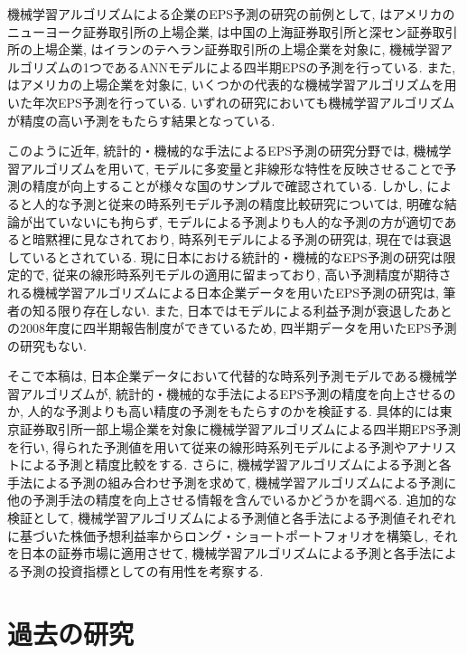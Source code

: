 \documentclass[a4paper, 12pt]{jsreport}
\begin{document}
機械学習アルゴリズムによる企業のEPS予測の研究の前例として, \cite{zhang2004neural}はアメリカのニューヨーク証券取引所の上場企業, \cite*{cao2009forecasting} は中国の上海証券取引所と深セン証券取引所の上場企業, \cite{etemadi2015earnings}はイランのテヘラン証券取引所の上場企業を対象に, 機械学習アルゴリズムの1つであるANNモデルによる四半期EPSの予測を行っている. また, \cite*{cao2020fundamental}はアメリカの上場企業を対象に, いくつかの代表的な機械学習アルゴリズムを用いた年次EPS予測を行っている. いずれの研究においても機械学習アルゴリズムが精度の高い予測をもたらす結果となっている. 

このように近年, 統計的・機械的な手法によるEPS予測の研究分野では, 機械学習アルゴリズムを用いて, モデルに多変量と非線形な特性を反映させることで予測の精度が向上することが様々な国のサンプルで確認されている. しかし, \cite{ota2006}によると人的な予測と従来の時系列モデル予測の精度比較研究については, 明確な結論が出ていないにも拘らず, モデルによる予測よりも人的な予測の方が適切であると暗黙裡に見なされており, 時系列モデルによる予測の研究は, 現在では衰退しているとされている. 現に日本における統計的・機械的なEPS予測の研究は限定的で, 従来の線形時系列モデルの適用に留まっており, 高い予測精度が期待される機械学習アルゴリズムによる日本企業データを用いたEPS予測の研究は, 筆者の知る限り存在しない. また, 日本ではモデルによる利益予測が衰退したあとの2008年度に四半期報告制度ができているため, 四半期データを用いたEPS予測の研究もない. 

そこで本稿は, 日本企業データにおいて代替的な時系列予測モデルである機械学習アルゴリズムが, 統計的・機械的な手法によるEPS予測の精度を向上させるのか, 人的な予測よりも高い精度の予測をもたらすのかを検証する. 具体的には東京証券取引所一部上場企業を対象に機械学習アルゴリズムによる四半期EPS予測を行い, 得られた予測値を用いて従来の線形時系列モデルによる予測やアナリストによる予測と精度比較をする. さらに, 機械学習アルゴリズムによる予測と各手法による予測の組み合わせ予測\citep*{bates1969combination}を求めて, 機械学習アルゴリズムによる予測に他の予測手法の精度を向上させる情報を含んでいるかどうかを調べる. 追加的な検証として, 機械学習アルゴリズムによる予測値と各手法による予測値それぞれに基づいた株価予想利益率からロング・ショートポートフォリオを構築し, それを日本の証券市場に適用させて, 機械学習アルゴリズムによる予測と各手法による予測の投資指標としての有用性を考察する. 


\chapter{過去の研究}
\end{document}

